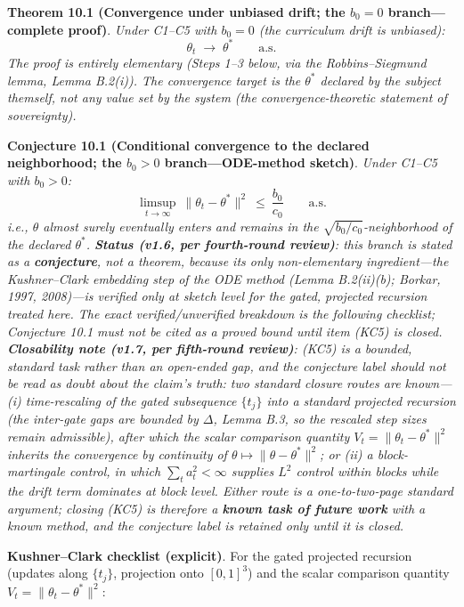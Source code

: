 \documentclass[
  11pt]{article}
\begin{document}
\textbf{Theorem 10.1 (Convergence under unbiased drift; the \(b_0 = 0\)
branch---complete proof)}. \emph{Under C1--C5 with \(b_0 = 0\) (the
curriculum drift is unbiased):}
\[\theta_t \;\to\; \theta^* \qquad \text{a.s.}\] \emph{The proof is
entirely elementary (Steps 1--3 below, via the Robbins--Siegmund lemma,
Lemma B.2(i)). The convergence target is the \(\theta^*\) declared by
the subject themself, not any value set by the system (the
convergence-theoretic statement of sovereignty).}

\textbf{Conjecture 10.1 (Conditional convergence to the declared
neighborhood; the \(b_0 > 0\) branch---ODE-method sketch)}. \emph{Under
C1--C5 with \(b_0 > 0\):}
\[\limsup_{t\to\infty}\ \|\theta_t - \theta^*\|^2 \ \le\ \frac{b_0}{c_0} \qquad \text{a.s.}\]
\emph{i.e., \(\theta\) almost surely eventually enters and remains in
the \(\sqrt{b_0/c_0}\)-neighborhood of the declared \(\theta^*\).
\textbf{Status (v1.6, per fourth-round review)}: this branch is stated
as a \textbf{conjecture}, not a theorem, because its only non-elementary
ingredient---the Kushner--Clark embedding step of the ODE method (Lemma
B.2(ii)(b); Borkar, 1997, 2008)---is verified only at sketch level for
the gated, projected recursion treated here. The exact
verified/unverified breakdown is the following checklist; Conjecture
10.1 must not be cited as a proved bound until item (KC5) is closed.
\textbf{Closability note (v1.7, per fifth-round review)}: (KC5) is a
bounded, standard task rather than an open-ended gap, and the conjecture
label should not be read as doubt about the claim's truth: two standard
closure routes are known---(i) time-rescaling of the gated subsequence
\(\{t_j\}\) into a standard projected recursion (the inter-gate gaps are
bounded by \(\Delta\), Lemma B.3, so the rescaled step sizes remain
admissible), after which the scalar comparison quantity
\(V_t = \|\theta_t-\theta^*\|^2\) inherits the convergence by continuity
of \(\theta \mapsto \|\theta-\theta^*\|^2\); or (ii) a block-martingale
control, in which \(\sum_t a_t^2 < \infty\) supplies \(L^2\) control
within blocks while the drift term dominates at block level. Either
route is a one-to-two-page standard argument; closing (KC5) is therefore
a \textbf{known task of future work} with a known method, and the
conjecture label is retained only until it is closed.}

\textbf{Kushner--Clark checklist (explicit)}. For the gated projected
recursion (updates along \(\{t_j\}\), projection onto \([0,1]^3\)) and
the scalar comparison quantity \(V_t = \|\theta_t-\theta^*\|^2\):
\end{document}
